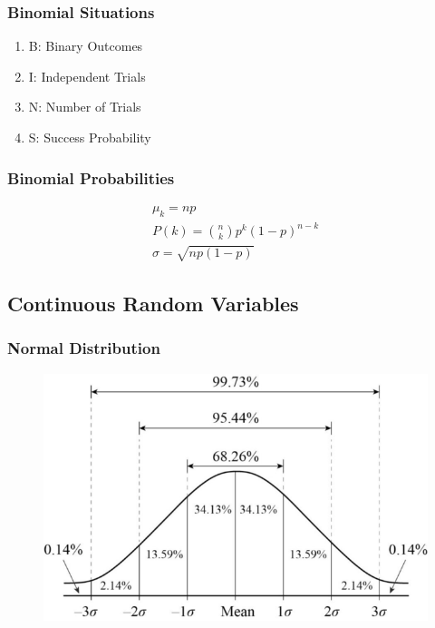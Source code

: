 \documentclass[12pt]{article}
\numberwithin{equation}{section}
\begin{document}
\subsubsection{Binomial Situations}
\begin{enumerate}
    \item B: Binary Outcomes
    \item I: Independent Trials
    \item N: Number of Trials
    \item S: Success Probability
\end{enumerate}
\subsubsection{Binomial Probabilities}
\begin{gather}
    \mu_k = np \\
    P(k) = \binom{n}{k} p^k (1-p)^{n-k} \\
    \sigma = \sqrt{np(1-p)}
\end{gather}

\subsection{Continuous Random Variables}
\subsubsection{Normal Distribution}
\begin{figure}[!ht]
    \centering
    \includegraphics[width=0.8\linewidth]{figures/normalcurve.png}
\end{figure}
\end{document}
